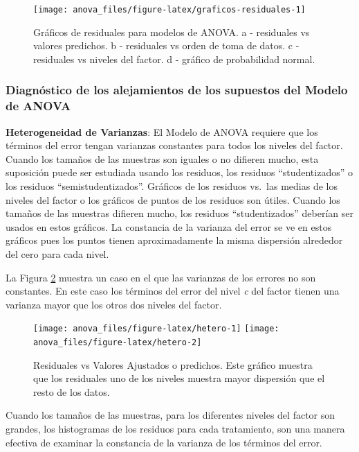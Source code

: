 \documentclass[]{book}
\theoremstyle{definition}
\theoremstyle{definition}
\theoremstyle{definition}
\theoremstyle{remark}
\begin{document}
\begin{figure}
\texttt{[image: anova\_files/figure-latex/graficos-residuales-1]} \caption{Gráficos de residuales para modelos de ANOVA.
a - residuales vs valores predichos. b - residuales vs orden de toma de
datos. c - residuales vs niveles del factor. d - gráfico de probabilidad
normal.}\label{fig:graficos-residuales}
\end{figure}

\hypertarget{diagnostico-de-los-alejamientos-de-los-supuestos-del-modelo-de-anova}{%
\subsubsection{Diagnóstico de los alejamientos de los supuestos del
Modelo de
ANOVA}\label{diagnostico-de-los-alejamientos-de-los-supuestos-del-modelo-de-anova}}

\textbf{Heterogeneidad de Varianzas}: El Modelo de ANOVA requiere que
los términos del error tengan varianzas constantes para todos los
niveles del factor. Cuando los tamaños de las muestras son iguales o no
difieren mucho, esta suposición puede ser estudiada usando los residuos,
los residuos ``studentizados'' o los residuos ``semistudentizados''.
Gráficos de los residuos vs.~las medias de los niveles del factor o los
gráficos de puntos de los residuos son útiles. Cuando los tamaños de las
muestras difieren mucho, los residuos ``studentizados'' deberían ser
usados en estos gráficos. La constancia de la varianza del error se ve
en estos gráficos pues los puntos tienen aproximadamente la misma
dispersión alrededor del cero para cada nivel.

La Figura \ref{fig:hetero} muestra un caso en el que las varianzas de
los errores no son constantes. En este caso los términos del error del
nivel \emph{c} del factor tienen una varianza mayor que los otros dos
niveles del factor.





\begin{figure}
\texttt{[image: anova\_files/figure-latex/hetero-1]} \texttt{[image: anova\_files/figure-latex/hetero-2]} \caption{Residuales vs Valores Ajustados o predichos. Este gráfico
muestra que los residuales uno de los niveles muestra mayor dispersión
que el resto de los datos.}\label{fig:hetero}
\end{figure}

Cuando los tamaños de las muestras, para los diferentes niveles del
factor son grandes, los histogramas de los residuos para cada
tratamiento, son una manera efectiva de examinar la constancia de la
varianza de los términos del error.
\end{document}
